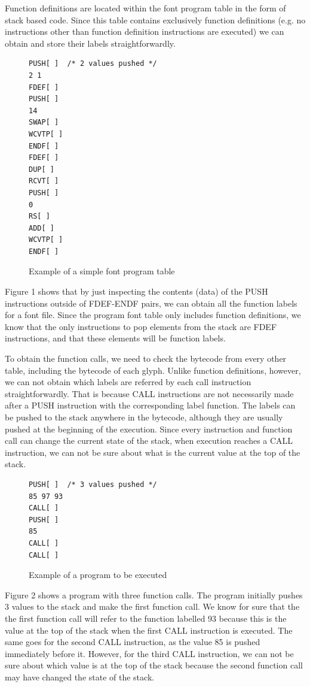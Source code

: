 \documentclass[12pt]{article}
\begin{document}
Function definitions are located within the font program table in the
form of stack based code. Since this table contains exclusively function
definitions (e.g. no instructions other than function definition
instructions are executed)  we can obtain and store their labels
straightforwardly. 

\begin{figure}[ht!]
\begin{verbatim}
PUSH[ ]  /* 2 values pushed */
2 1
FDEF[ ]
PUSH[ ]
14
SWAP[ ]
WCVTP[ ]
ENDF[ ]
FDEF[ ]
DUP[ ]
RCVT[ ]
PUSH[ ]
0
RS[ ]
ADD[ ]
WCVTP[ ]
ENDF[ ]
\end{verbatim}
\caption{Example of a simple font program table}
\end{figure}


Figure 1 shows that by just inspecting the contents (data) of
the PUSH instructions outside of FDEF-ENDF pairs, we can obtain all the
function labels for a font file. Since the program font table only
includes function definitions, we know that the only instructions to pop
elements from the stack are FDEF instructions, and that these elements
will be function labels.

To obtain the function calls, we need to check the bytecode from every
other table, including the bytecode of each glyph. Unlike function
definitions, however, we can not obtain which labels are referred by each
call instruction straightforwardly. That is because CALL instructions
are not necessarily made after a PUSH instruction with the corresponding
label function. The labels can be pushed to the stack anywhere in the
bytecode, although they are usually pushed at the beginning of the
execution. Since every instruction and function call can change the
current state of the stack, when execution reaches a CALL instruction, we
can not be sure about what is the current value at the top of the stack. 

\begin{figure}[ht!]
\begin{verbatim}
PUSH[ ]  /* 3 values pushed */
85 97 93
CALL[ ]
PUSH[ ]
85
CALL[ ]
CALL[ ]
\end{verbatim}
\caption{Example of a program to be executed}
\end{figure}

Figure 2 shows a program with three function calls. The program
initially pushes 3 values to the stack and make the first function call.
We know for sure that the the first function call will refer to the
function labelled 93 because this is the value at the top of the stack
when the first CALL instruction is executed. The same goes for the
second CALL instruction, as the value 85 is pushed immediately before
it. However, for the third CALL instruction, we can not be sure about which
value is at the top of the stack because the second function call may have
changed the state of the stack.  
\end{document}
